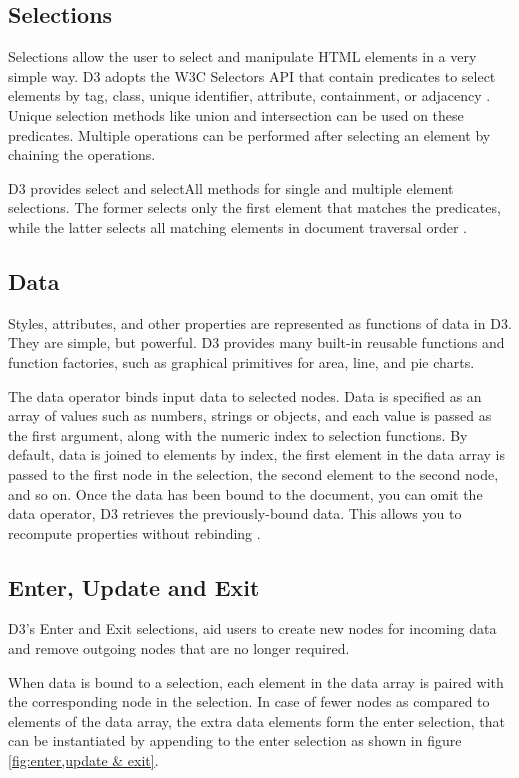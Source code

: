 \documentclass[9pt,twocolumn,twoside]{styles/osajnl}
\begin{document}
\subsection{Selections}
Selections allow the user to select and manipulate HTML elements in a very simple way. D3 adopts the W3C Selectors API \cite{www-w3c} that contain predicates to select elements by tag, class, unique identifier, attribute, containment, or adjacency \cite{www-d3}. Unique selection methods like union and intersection can be used on these predicates. Multiple operations can be performed after selecting an element by chaining the operations. 

D3 provides select and selectAll methods for single and multiple element selections. The former selects only the first element that matches the predicates, while the latter selects all matching elements in document traversal order \cite{paper-d3}.

   
    
\subsection{Data}
Styles, attributes, and other properties are represented as functions of data in D3. They are simple, but powerful. D3 provides many built-in reusable functions and function factories, such as graphical primitives for area, line, and pie charts.

The data operator binds input data to selected nodes. Data is specified as an array of values such as numbers, strings or objects, and each value is passed as the first argument, along with the numeric index to selection functions. By default, data is joined to elements by index, the first element in the data array is passed to the first node in the selection, the second element to the second node, and so on. Once the data has been bound to the document, you can omit the data operator, D3 retrieves the previously-bound data. This allows you to recompute properties without rebinding \cite{www-d3}.

   
    
\subsection{Enter, Update and Exit}
D3’s Enter and Exit selections, aid users to create new nodes for incoming data and remove outgoing nodes that are no longer required.

When data is bound to a selection, each element in the data array is paired with the corresponding node in the selection. In case of fewer nodes as compared to elements of the data array, the extra data elements form the enter selection, that can be instantiated by appending to the enter selection as shown in figure \ref{fig:enter,update & exit}. 
\end{document}
